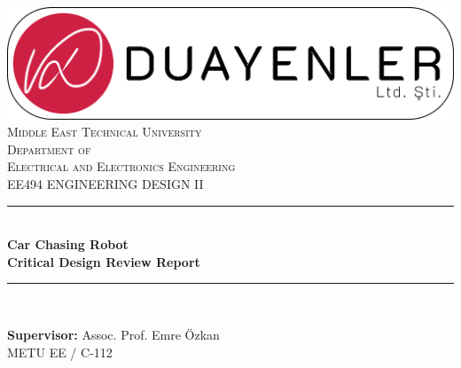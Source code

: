 \documentclass[a4paper,12pt]{article}
\begin{document}
\begin{titlepage}


\newcommand{\HRule}{\rule{\linewidth}{0.5mm}} %

\centering 


\includegraphics[width=\textwidth,height=\textheight,keepaspectratio]{../../documents/logos/logo3-with-stroke}\\[0.5cm]


\textsc{\LARGE Middle East Technical University}\\[0.5cm] %

\textsc{\Large Department of \\Electrical and Electronics Engineering }\\[0.5cm] %

\textsc{\large EE494 ENGINEERING DESIGN II}\\[0.5cm] %



\HRule \\[0cm]

{ \huge \bfseries  Car Chasing Robot\\[0.1cm] \LARGE \bfseries Critical Design Review Report}\\[0cm] %

\HRule \\[1cm]


\begin{minipage}[l]{0.6\textwidth}

\raggedright

\large{\textbf{Supervisor:}}	Assoc. Prof. Emre Özkan \\

\hspace{3.05cm}  METU EE / C-112


\end{minipage}

\begin{minipage}[r]{0.35\textwidth}

\raggedright


\end{minipage}
\end{titlepage}
\end{document}
